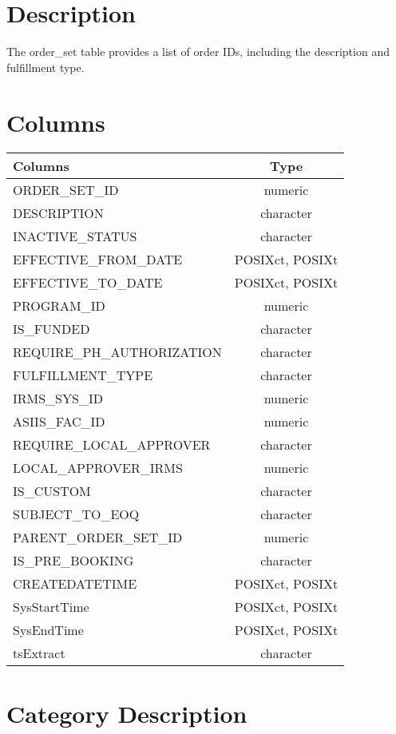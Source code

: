 \documentclass[
  letterpaper,
  DIV=11,
  numbers=noendperiod]{scrreprt}
\begin{document}
\hypertarget{description-22}{%
\section*{Description}\label{description-22}}

The order\_set table provides a list of order IDs, including the
description and fulfillment type.

\hypertarget{columns-22}{%
\section*{Columns}\label{columns-22}}

\begin{longtable}{lc}
\toprule
Columns & Type \\ 
\midrule
ORDER\_SET\_ID & numeric \\ 
DESCRIPTION & character \\ 
INACTIVE\_STATUS & character \\ 
EFFECTIVE\_FROM\_DATE & POSIXct, POSIXt \\ 
EFFECTIVE\_TO\_DATE & POSIXct, POSIXt \\ 
PROGRAM\_ID & numeric \\ 
IS\_FUNDED & character \\ 
REQUIRE\_PH\_AUTHORIZATION & character \\ 
FULFILLMENT\_TYPE & character \\ 
IRMS\_SYS\_ID & numeric \\ 
ASIIS\_FAC\_ID & numeric \\ 
REQUIRE\_LOCAL\_APPROVER & character \\ 
LOCAL\_APPROVER\_IRMS & numeric \\ 
IS\_CUSTOM & character \\ 
SUBJECT\_TO\_EOQ & character \\ 
PARENT\_ORDER\_SET\_ID & numeric \\ 
IS\_PRE\_BOOKING & character \\ 
CREATEDATETIME & POSIXct, POSIXt \\ 
SysStartTime & POSIXct, POSIXt \\ 
SysEndTime & POSIXct, POSIXt \\ 
tsExtract & character \\ 
\bottomrule
\end{longtable}

\hypertarget{category-description-22}{%
\section*{Category Description}\label{category-description-22}}
\end{document}
